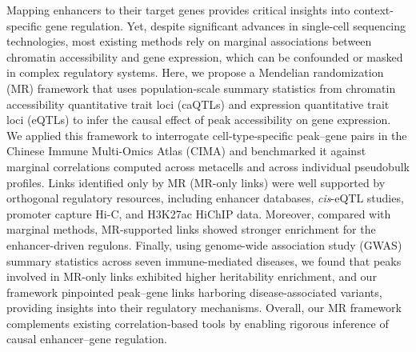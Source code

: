 Mapping enhancers to their target genes provides critical insights into context-specific gene regulation. Yet, despite significant advances in single-cell sequencing technologies, most existing methods rely on marginal associations between chromatin accessibility and gene expression, which can be confounded or masked in complex regulatory systems. Here, we propose a Mendelian randomization (MR) framework that uses population-scale summary statistics from chromatin accessibility quantitative trait loci (caQTLs) and expression quantitative trait loci (eQTLs) to infer the causal effect of peak accessibility on gene expression. We applied this framework to interrogate cell-type-specific peak--gene pairs in the Chinese Immune Multi-Omics Atlas (CIMA) and benchmarked it against marginal correlations computed across metacells and across individual pseudobulk profiles. Links identified only by MR (MR-only links) were well supported by orthogonal regulatory resources, including enhancer databases, \textit{cis}-eQTL studies, promoter capture Hi-C, and H3K27ac HiChIP data. Moreover, compared with marginal methods, MR-supported links showed stronger enrichment for the enhancer-driven regulons. Finally, using genome-wide association study (GWAS) summary statistics across seven immune-mediated diseases, we found that peaks involved in MR-only links exhibited higher heritability enrichment, and our framework pinpointed peak--gene links harboring disease-associated variants, providing insights into their regulatory mechanisms. Overall, our MR framework complements existing correlation-based tools by enabling rigorous inference of causal enhancer--gene regulation.


